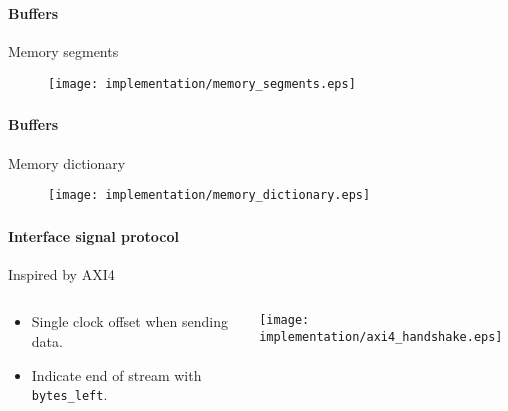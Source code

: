 \begin{frame}[fragile]
    \frametitle{\ImplementationTitle}
    \framesubtitle{Buffers}
    Memory segments\\
    \begin{minipage}[t]{1\textwidth}
        \begin{figure}
                \centering
                \texttt{[image: implementation/memory\_segments.eps]}
        \end{figure}
    \end{minipage}
\end{frame}

\begin{frame}[fragile]
    \frametitle{\ImplementationTitle}
    \framesubtitle{Buffers}
    Memory dictionary\\
    \begin{minipage}[t]{1\textwidth}
        \begin{figure}
                \centering
                \texttt{[image: implementation/memory\_dictionary.eps]}
        \end{figure}
    \end{minipage}
\end{frame}



\begin{frame}[fragile]
    \frametitle{\ImplementationTitle}
    \framesubtitle{Interface signal protocol}
    Inspired by AXI4\\
    \begin{columns}
        \begin{column}{0.4\textwidth}
           \begin{itemize}
               \item Single clock offset when sending data.
               \item Indicate end of stream with \texttt{bytes\_left}.
           \end{itemize}
        \end{column}
        \begin{column}{0.5\textwidth}  %
            \texttt{[image: implementation/axi4\_handshake.eps]}
        \end{column}
    \end{columns}
\end{frame}


